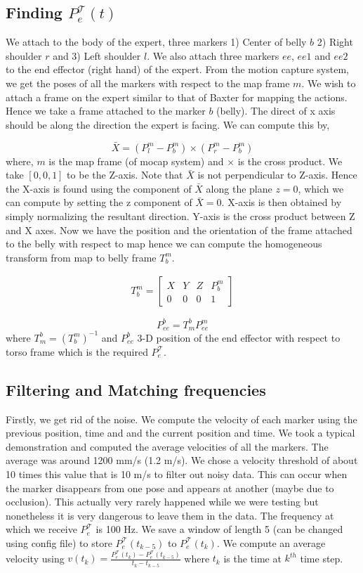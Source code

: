 \documentclass{article}[11pt]
\begin{document}
\subsection{Finding $P^\mathcal{T}_e(t)$}
We attach to the body of the expert, three markers 1) Center of belly $b$ 2) Right shoulder $r$ and 3) Left shoulder $l$. We also attach three markers $ee$, $ee1$ and $ee2$ to the end effector (right hand) of the expert. From the motion capture system, we get the poses of all the markers with respect to the map frame $m$. We wish to attach a frame on the expert similar to that of Baxter for mapping the actions. Hence we take a frame attached to the marker $b$ (belly). The direct of x axis should be along the direction the expert is facing. We can compute this by,

$$\bar{X} = (P^m_l - P^m_b)\times(P^m_r - P^m_b)$$ where, $m$ is the map frame (of mocap system) and $\times$ is the cross product. We take $[0,0,1]$ to be the Z-axis. Note that $\bar{X}$ is not perpendicular to Z-axis. Hence the X-axis is found using the component of $\bar{X}$ along the plane $z=0$, which we can compute by setting the z component of $\bar{X} = 0$. X-axis is then obtained by simply normalizing the resultant direction. Y-axis is the cross product between Z and X axes. Now we have the position and the orientation of the frame attached to the belly with respect to map hence we can compute the homogeneous transform from map to belly frame $T^m_b$. 

\begin{align*}
T^m_b = 
\begin{bmatrix}
X&Y&Z&P^m_b\\
0&0&0&1
\end{bmatrix}
\end{align*}



$$P^b_{ee} = T^b_m P^m_{ee}$$
where $T^b_m = (T^m_b)^{-1}$ and $P^b_{ee}$ 3-D position of the end effector with respect to torso frame which is the required $P^\mathcal{T}_e$. 

\subsection{Filtering and Matching frequencies}
Firstly, we get rid of the noise. We compute the velocity of each marker using the previous position, time and and the current position and time. We took a typical demonstration and computed the average velocities of all the markers. The average was around 1200 mm/s (1.2 m/s). We chose a velocity threshold of about 10 times this value that is 10 m/s to filter out noisy data. This can occur when the marker disappears from one pose and appears at another (maybe due to occlusion). This actually very rarely happened while we were testing but nonetheless it is very dangerous to leave them in the data. 
The frequency at which we receive $P^\mathcal{T}_e$ is 100 Hz. We save a window of length 5 (can be changed using config file) to store $P^\mathcal{T}_e(t_{k-5})$ to $P^\mathcal{T}_e(t_k)$. We compute an average velocity using $v(t_k) = \frac{P^\mathcal{T}_e(t_k)-P^\mathcal{T}_e(t_{k-5})}{t_k-t_{k-5}}$ where $t_k$ is the time at $k^{th}$ time step. 
\end{document}
